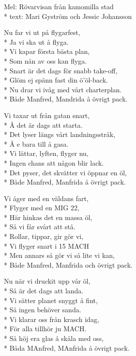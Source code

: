 \begin{SongText}[FLygturen]
    \begin{SongInfo}
        Mel: Rövarvisan från kamomilla stad\\*%
        text: Mari Gyström och Jessic Johansson
    \end{SongInfo}
    \begin{SongVerse}
        Nu far vi ut på flygarfest,\\*%
        Ja vi ska ut å flyga.\\*%
        Vi kapar första bästa plan,\\*%
        Som nån av oss kan flyga.\\*%
        Snart är det dags för snabb take-off,\\*%
        Glöm ej spänn fast din ö'öl-back.\\*%
        Nu drar vi ivåg med vårt charterplan.\\*%
        Både Manfred, Mandrida å övrigt pack.
    \end{SongVerse}
    \begin{SongVerse}
        Vi taxar ut från gatan snart,\\*%
        Å det är dags att starta.\\*%
        Det lyser längs vårt landningsstråk,\\*%
        Å e bara till å gasa.\\*%
        Vi lättar, lyften, flyger nu,\\*%
        Ingen chans att någon blir lack.\\*%
        Det pyser, det skvätter vi öppnar en öl,\\*%
        Både Manfred, Manfrida å övrigt pack.
    \end{SongVerse}
    \begin{SongVerse}
        Vi åger med en väldans fart,\\*%
        Flyger med en MIG 22,\\*%
        Här hinkas det en massa öl,\\*%
        Så vi får svårt att stå.\\*%
        Rollar, tippar, gir gör vi,\\*%
        Vi flyger snart i 15 MACH\\*%
        Men annars så gör vi så lite vi kan,\\*%
        Både Manfred, Manfrida och övrigt pack.
    \end{SongVerse}
    \begin{SongVerse}
        Nu när vi druckit upp vår öl,\\*%
        Så är det dags att landa.\\*%
        Vi sätter planet snyggt å fint,\\*%
        Så ingen behöver sanda.\\*%
        Vi klarar oss från krasch idag,\\*%
        För alla tillhör ju MACH.\\*%
        Så höj era glas å skåla med oss,\\*%
        Båda MAnfred, MAnfrida å övrigt pack.
    \end{SongVerse}
\end{SongText}
